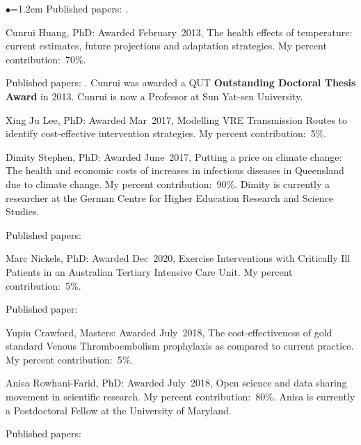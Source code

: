 \documentclass[a4paper,11pt]{article}
\renewcommand{\labelitemi}{$\bullet$}
\begin{document}
\begin{raggedright}
\begin{list}{\labelitemi}{\leftmargin=1.2em}
Published papers: . %

\item Cunrui Huang, PhD: Awarded February~2013, The health effects of temperature: current estimates, future projections and adaptation strategies. My percent contribution:~70\%.

Published papers: . Cunrui was awarded a QUT \textbf{Outstanding Doctoral Thesis Award} in 2013. Cunrui is now a Professor at Sun Yat-sen University.

\item Xing Ju Lee, PhD: Awarded Mar~2017, Modelling VRE Transmission Routes to identify cost-effective intervention strategies. My percent contribution:~5\%.

\item Dimity Stephen, PhD: Awarded June~2017, Putting a price on climate change: The health and economic costs of increases in infectious diseases in Queensland due to climate change. My percent contribution:~90\%. Dimity is currently a researcher at the German Centre for Higher Education Research and Science Studies.

Published papers: 

\item Marc Nickels, PhD: Awarded Dec~2020, Exercise Interventions with Critically Ill Patients in an Australian Tertiary Intensive Care Unit. My percent contribution:~5\%.

Published paper: 

\item Yupin Crawford, Masters: Awarded July~2018, The cost-effectiveness of gold standard Venous Thromboembolism prophylaxis as compared to current practice. My percent contribution:~5\%.

\item Anisa Rowhani-Farid, PhD: Awarded July~2018, Open science and data sharing movement in scientific research. My percent contribution:~80\%. Anisa is currently a Postdoctoral Fellow at the University of Maryland.

Published papers: 


\end{list}
\end{raggedright}
\end{document}
